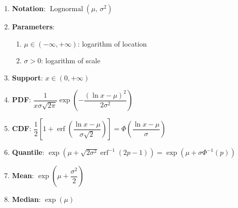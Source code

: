 \begin{enumerate}
    \item \textbf{Notation}: 
    ${\displaystyle \operatorname {Lognormal} \left(\mu ,\,\sigma ^{2}\right)}$
    \hfill \cite{wiki/Log-normal_distribution}

    \item \textbf{Parameters}:
    \begin{enumerate}
        \item ${\displaystyle \mu \in (-\infty ,+\infty )}$: logarithm of location
        \hfill \cite{wiki/Log-normal_distribution, statistics/book/Statistics-for-Data-Scientists/Maurits-Kaptein}

        \item ${\displaystyle \sigma >0}$: logarithm of scale
        \hfill \cite{wiki/Log-normal_distribution, statistics/book/Statistics-for-Data-Scientists/Maurits-Kaptein}
    \end{enumerate}

    \item \textbf{Support}: ${\displaystyle x\in (0,+\infty )}$
    \hfill \cite{wiki/Log-normal_distribution, statistics/book/Statistics-for-Data-Scientists/Maurits-Kaptein}

    \item \textbf{PDF}:
    ${\displaystyle {\dfrac {1}{x\sigma {\sqrt {2\pi }}}}\exp \left(-{\dfrac {\left(\ln x-\mu \right)^{2}}{2\sigma ^{2}}}\right)}$
    \hfill \cite{wiki/Log-normal_distribution, statistics/book/Statistics-for-Data-Scientists/Maurits-Kaptein}

    \item \textbf{CDF}:
    $
        {\displaystyle {{\dfrac {1}{2}}\left[1+\operatorname {erf} \left({\dfrac {\ln x-\mu }{\sigma {\sqrt {2}}}}\right)\right] 
        =\Phi {\left({\dfrac {\ln x-\mu }{\sigma }}\right)}}}
    $
    \hfill \cite{wiki/Log-normal_distribution}

    \item \textbf{Quantile}: 
    $
        {\displaystyle {\exp \left(\mu +{\sqrt {2\sigma ^{2}}}\operatorname {erf} ^{-1}(2p-1)\right)
        =\exp(\mu +\sigma \Phi ^{-1}(p))}}
    $
    \hfill \cite{wiki/Log-normal_distribution}

    \item \textbf{Mean}: ${\displaystyle \exp \left(\mu +{\dfrac {\sigma ^{2}}{2}}\right)}$
    \hfill \cite{wiki/Log-normal_distribution}

    \item \textbf{Median}: ${\displaystyle \exp(\mu )}$
    \hfill \cite{wiki/Log-normal_distribution}


\end{enumerate}
